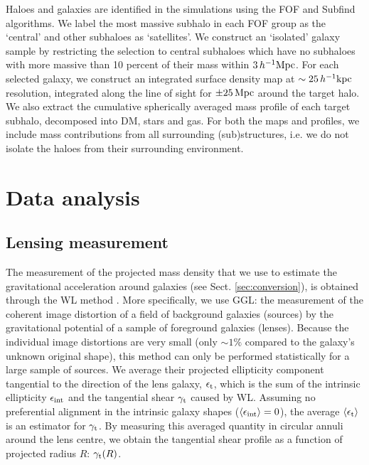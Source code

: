 \documentclass[usenatbib]{mnras}
\newcommand{\hkpc}{\, h^{-1}{\rm{kpc}} }
\newcommand{\hMpc}{\, h^{-1}{\rm{Mpc}} }
\newcommand{\lan}{\langle}
\newcommand{\ran}{\rangle}
\newcommand{\un}[1]{_{\rm #1}}
\newcommand{\dex}{\, {\rm dex}}
\begin{document}
Haloes and galaxies are identified in the simulations using the FOF \citep{davis1985} and Subfind \citep{springel2001,dolag2009} algorithms. We label the most massive subhalo in each FOF group as the `central' and other subhaloes as `satellites'.
We construct an `isolated' galaxy sample by restricting the selection to central subhaloes which have no subhaloes with more massive than 10 percent of their mass within $3 \hMpc$. For each selected galaxy, we construct an integrated surface density map at $\sim 25\hkpc$ resolution, integrated along the line of sight for $\pm 25\,{\rm Mpc}$ around the target halo. We also extract the cumulative spherically averaged mass profile of each target subhalo, decomposed into DM, stars and gas. For both the maps and profiles, we include mass contributions from all surrounding (sub)structures, i.e. we do not isolate the haloes from their surrounding environment.


\section{Data analysis}
\label{sec:analysis}

\subsection{Lensing measurement}
\label{sec:lensing}

The measurement of the projected mass density that we use to estimate the gravitational acceleration around galaxies (see Sect. \ref{sec:conversion}), is obtained through the WL method \cite[for a general introduction, see][]{bartelmann2001,schneider2006}. More specifically, we use GGL: the measurement of the coherent image distortion of a field of background galaxies (sources) by the gravitational potential of a sample of foreground galaxies (lenses). Because the individual image distortions are very small (only $\sim1\%$ compared to the galaxy's unknown original shape), this method can only be performed statistically for a large sample of sources. We average their projected ellipticity component tangential to the direction of the lens galaxy, $\epsilon\un{t}$, which is the sum of the intrinsic ellipticity $\epsilon\un{int}$ and the tangential shear $\gamma\un{t}$ caused by WL. Assuming no preferential alignment in the intrinsic galaxy shapes ($\lan\epsilon\un{int}\ran=0$), the average $\lan\epsilon\un{t}\ran$ is an estimator for $\gamma\un{t}$. By measuring this averaged quantity in circular annuli around the lens centre, we obtain the tangential shear profile as a function of projected radius $R$: $\gamma\un{t}(R)$.
\end{document}
